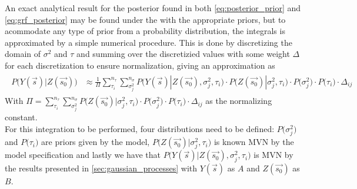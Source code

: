 An exact analytical result for the posterior found in both \ref{eq:posterior_prior} and \ref{eq:grf_posterior} may be found under the with the appropriate priors, but to acommodate any type of prior from a probability distribution, the integrals is approximated by a simple numerical procedure. This is done by discretizing the domain of $\sigma^2$ and $\tau$ and summing over the discretizied values with some weight $\Delta$ for each discretization to ensure normalization, giving an approximation as
\begin{align*}
\begin{split}
P \big( Y(\vec{s}) | Z(\vec{s_0}) \big) &\approx \frac{1}{\Pi}\sum_{\tau_i}^{n_{\tau}} \sum_{\sigma^2_j}^{n_{\sigma}} P \big( Y(\vec{s}) | Z(\vec{s_0}), \sigma^2_j, \tau_i \big) \cdot P\big( Z(\vec{s_0}) | \sigma^2_j, \tau_i \big) \cdot P\big( \sigma^2_j \big) \cdot P\big( \tau_i \big) \cdot \Delta_{ij}
\end{split}
\end{align*}
With $\Pi = \sum_{\tau_i}^{n_{\tau}} \sum_{\sigma^2_j}^{n_{\sigma}} P\big( Z(\vec{s_0}) | \sigma^2_j, \tau_i \big) \cdot P\big( \sigma^2_j \big) \cdot P\big( \tau_i \big) \cdot \Delta_{ij}$ as the normalizing constant. \\

For this integration to be performed, four distributions need to be defined: $P\big( \sigma^2_j \big)$ and $P\big( \tau_i \big)$ are priors given by the model, $P\big( Z(\vec{s_0}) | \sigma^2_j, \tau_i \big)$ is known MVN by the model specification and lastly we have that $P \big( Y(\vec{s}) | Z(\vec{s_0}), \sigma^2_j, \tau_i \big)$ is MVN by the results presented in \ref{sec:gaussian_processes} with $Y(\vec{s})$ as $A$ and $Z(\vec{s_0})$ as $B$. \\

